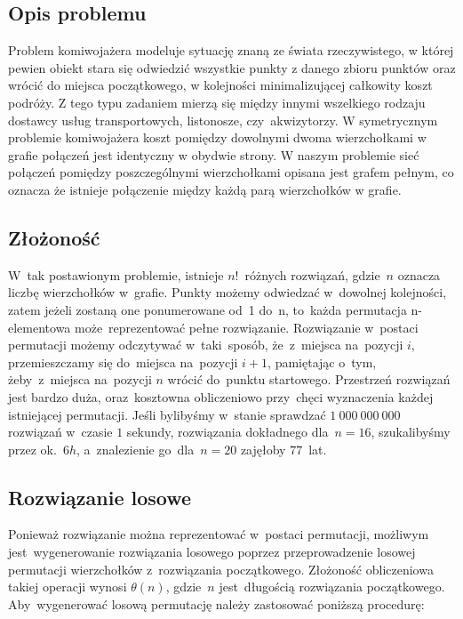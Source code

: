 \subsection{Opis problemu}

Problem komiwojażera modeluje sytuację znaną ze świata rzeczywistego, w której pewien obiekt stara się odwiedzić wszystkie punkty z danego zbioru punktów oraz wrócić do miejsca początkowego, w kolejności minimalizującej całkowity koszt podróży. Z tego typu zadaniem mierzą się między innymi wszelkiego rodzaju dostawcy usług transportowych, listonosze, czy~akwizytorzy. W symetrycznym problemie komiwojażera koszt pomiędzy dowolnymi dwoma wierzchołkami w grafie połączeń jest identyczny w obydwie strony. W naszym problemie sieć połączeń pomiędzy poszczególnymi wierzchołkami opisana jest grafem pełnym, co oznacza że istnieje połączenie między każdą parą wierzchołków w grafie.

\subsection{Złożoność}

W~tak postawionym problemie, istnieje $n!$~różnych rozwiązań, gdzie~$n$ oznacza liczbę wierzchołków w~grafie. Punkty możemy odwiedzać w~dowolnej kolejności, zatem jeżeli zostaną one ponumerowane od~1 do~n, to~każda permutacja n-elementowa może~reprezentować pełne rozwiązanie. Rozwiązanie w~postaci permutacji możemy odczytywać w~taki~sposób, że~z~miejsca na~pozycji $i$, przemieszczamy się do~miejsca na~pozycji $i+1$, pamiętając o~tym, żeby~z~miejsca na~pozycji $n$ wrócić do~punktu startowego. Przestrzeń rozwiązań jest bardzo duża, oraz~kosztowna obliczeniowo przy~chęci wyznaczenia każdej istniejącej permutacji. Jeśli bylibyśmy w~stanie sprawdzać $1\ 000\ 000\ 000$ rozwiązań w~czasie $1$ sekundy, rozwiązania dokładnego dla~$n=16$, szukalibyśmy przez ok.~$6h$, a~znalezienie go~dla~$n=20$ zajęłoby $77$~lat.

\subsection{Rozwiązanie losowe}

Ponieważ rozwiązanie można reprezentować w~postaci permutacji, możliwym jest~wygenerowanie rozwiązania losowego poprzez przeprowadzenie losowej permutacji wierzchołków z~rozwiązania początkowego. Złożoność obliczeniowa takiej operacji wynosi $\theta(n)$, gdzie~$n$ jest~długością rozwiązania początkowego. Aby~wygenerować losową permutację należy zastosować poniższą procedurę:

